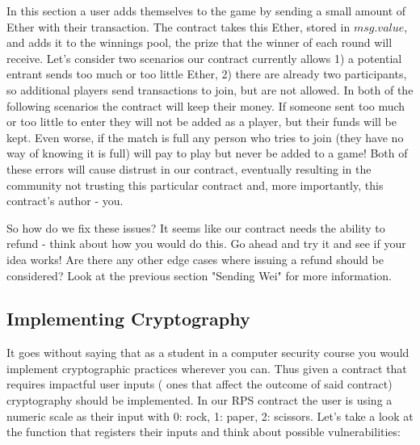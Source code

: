 \documentclass[12pt]{article}
\begin{document}

In this section a user adds themselves to the game by sending a small amount of Ether with their transaction. The contract takes this Ether, stored in $msg.value$, and adds it to the winnings pool, the prize that the winner of each round will receive. Let's consider two scenarios our contract currently allows 1) a potential entrant sends too much or too little Ether, 2) there are already two participants, so additional players send transactions to join, but are not allowed. In both of the following scenarios the contract will keep their money. If someone sent too much or too little to enter they will not be added as a player, but their funds will be kept. Even worse, if the match is full any person who tries to join (they have no way of knowing it is full) will pay to play but never be added to a game! Both of these errors will cause distrust in our contract, eventually resulting in the community not trusting this particular contract and, more importantly, this contract's author - you.

So how do we fix these issues? It seems like our contract needs the ability to refund - think about how you would do this. Go ahead and try it and see if your idea works! Are there any other edge cases where issuing a refund should be considered? Look at the previous section "Sending Wei" for more information. 

\subsection{Implementing Cryptography}
It goes without saying that as a student in a computer security course you would implement cryptographic practices wherever you can. Thus given a contract that requires impactful user inputs ( ones that affect the outcome of said contract) cryptography should be implemented. In our RPS contract the user is using a numeric scale as their input with 0: rock, 1: paper, 2: scissors. Let's take a look at the function that registers their inputs and think about possible vulnerabilities:
\end{document}
